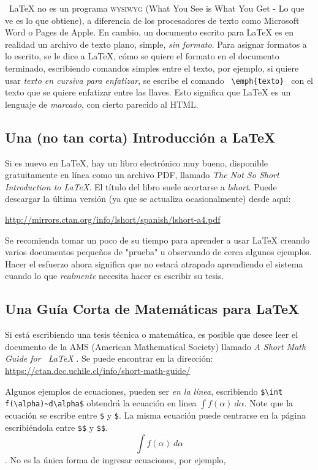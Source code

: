 \ LaTeX {} no es un programa \textsc{wysiwyg} (What You See is What You Get - Lo que ve es lo que obtiene), a diferencia de los procesadores de texto como Microsoft Word o Pages de Apple. En cambio, un documento escrito para \LaTeX{} es en realidad un archivo de texto plano, simple, \emph {sin formato}. Para asignar formatos a lo escrito, se le dice a \LaTeX{}, cómo se quiere el formato en el documento terminado, escribiendo comandos simples entre el texto, por ejemplo, si quiere usar \emph{texto en cursiva para enfatizar}, se escribe el comando \verb | \emph{texto} |  con el texto que se quiere enfatizar  entre las llaves. Esto significa que \LaTeX{} es un lenguaje de \textit{marcado}, con cierto parecido  al HTML.



\subsection{Una (no tan corta) Introducción a \LaTeX{}}

Si es nuevo en \LaTeX{}, hay un libro electrónico muy bueno, disponible gratuitamente en línea como un archivo PDF, llamado \textit {The Not So Short Introduction to \LaTeX{}}. El título del libro suele acortarse a  \emph{lshort}. Puede descargar la última versión (ya que se actualiza ocasionalmente) desde aquí:

\url{http://mirrors.ctan.org/info/lshort/spanish/lshort-a4.pdf}

Se recomienda tomar un poco de su tiempo para aprender a usar  \LaTeX{} creando varios documentos pequeños de "prueba" u observando de cerca algunos ejemplos. Hacer el esfuerzo ahora significa que no estará atrapado aprendiendo el sistema cuando lo que \emph{realmente} necesita hacer es escribir su tesis.


\subsection{Una Guía Corta de Matemáticas para \LaTeX{}}

Si está escribiendo una tesis técnica o matemática, es posible que desee leer el documento de la AMS (American Mathematical Society) llamado \textit{A Short Math Guide for \ LaTeX {}}. Se puede encontrar en la dirección:
\url {https://ctan.dcc.uchile.cl/info/short-math-guide/}

Algunos ejemplos de ecuaciones, pueden ser \emph{en la línea}, escribiendo \verb*|$\int f(\alpha)~d\alpha$| obtendrá la ecuación en línea  $\int f(\alpha)~d\alpha$. Note que la ecuación se escribe entre \verb|$| y \verb|$|. La misma ecuación puede centrarse en la página escribiéndola entre \verb|$$| y \verb|$$|. $$\int f(\alpha)~d\alpha$$. No es la única forma de ingresar ecuaciones,  por ejemplo,

